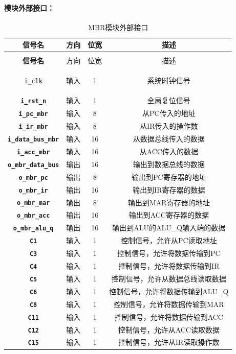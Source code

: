 \documentclass[lang=cn,a4paper,newtx]{elegantpaper}
\begin{document}
\paragraph{模块外部接口：}
\begin{longtable}{>{\bfseries}c c c c}
  \caption{MBR模块外部接口} \\ 
  \toprule
  信号名 & 方向 & 位宽 & 描述 \\ 
  \midrule
  \endfirsthead

  \multicolumn{4}{l}{\textbf{（续表）MBR模块外部接口}} \\ 
  \toprule
  信号名 & 方向 & 位宽 & 描述 \\ 
  \midrule
  \endhead

  \texttt{i\_clk} & 输入 & 1 & 系统时钟信号 \\ 
  \texttt{i\_rst\_n} & 输入 & 1 & 全局复位信号 \\ 
  \texttt{i\_pc\_mbr} & 输入 & 8 & 从PC传入的地址 \\ 
  \texttt{i\_ir\_mbr} & 输入 & 8 & 从IR传入的操作数 \\ 
  \texttt{i\_data\_bus\_mbr} & 输入 & 16 & 从数据总线传入的数据 \\ 
  \texttt{i\_acc\_mbr} & 输入 & 16 & 从ACC传入的数据 \\ 
  \texttt{o\_mbr\_data\_bus} & 输出 & 16 & 输出到数据总线的数据 \\ 
  \texttt{o\_mbr\_pc} & 输出 & 8 & 输出到PC寄存器的地址 \\ 
  \texttt{o\_mbr\_ir} & 输出 & 16 & 输出到IR寄存器的数据 \\ 
  \texttt{o\_mbr\_mar} & 输出 & 8 & 输出到MAR寄存器的地址 \\ 
  \texttt{o\_mbr\_acc} & 输出 & 16 & 输出到ACC寄存器的数据 \\ 
  \texttt{o\_mbr\_alu\_q} & 输出 & 16 & 输出到ALU的ALU\_Q输入端的数据 \\ 
  \texttt{C1} & 输入 & 1 & 控制信号，允许从PC读取地址 \\ 
  \texttt{C3} & 输入 & 1 & 控制信号，允许将数据传输到PC \\ 
  \texttt{C4} & 输入 & 1 & 控制信号，允许将数据传输到IR \\ 
  \texttt{C5} & 输入 & 1 & 控制信号，允许从数据总线读取数据 \\ 
  \texttt{C6} & 输入 & 1 & 控制信号，允许将数据传输到ALU\_Q \\ 
  \texttt{C8} & 输入 & 1 & 控制信号，允许将数据传输到MAR \\ 
  \texttt{C11} & 输入 & 1 & 控制信号，允许将数据传输到ACC \\ 
  \texttt{C12} & 输入 & 1 & 控制信号，允许从ACC读取数据 \\ 
  \texttt{C15} & 输入 & 1 & 控制信号，允许从IR读取操作数 \\ 
  \bottomrule
\end{longtable}
\end{document}
